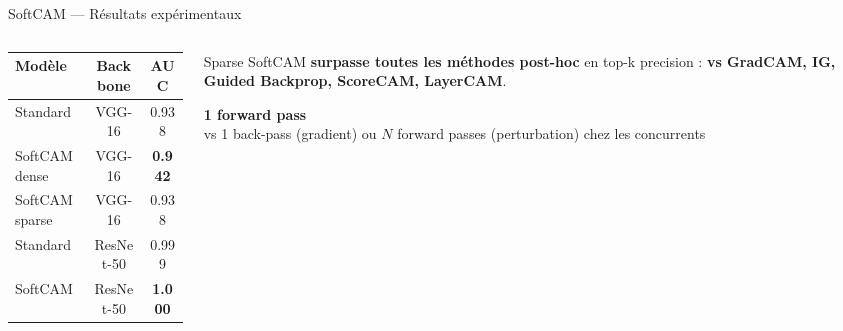 \documentclass[10pt]{beamer}
\begin{document}
\begin{frame}{SoftCAM — Résultats expérimentaux}
  \begin{columns}
    \begin{column}{0.50\textwidth}
      \begin{tcolorbox}[colback=blue!3, colframe=blue!50!black, arc=2mm,
                        fonttitle=\bfseries, title=Performance préservée (Table 1)]
        \begin{tabular}{lcc}
          \toprule
          \textbf{Modèle} & \textbf{Backbone} & \textbf{AUC} \\
          \midrule
          Standard         & VGG-16    & 0.938 \\
          SoftCAM dense    & VGG-16    & \textbf{0.942} \\
          SoftCAM sparse   & VGG-16    & 0.938 \\
          Standard         & ResNet-50 & 0.999 \\
          SoftCAM          & ResNet-50 & \textbf{1.000} \\
          \bottomrule
        \end{tabular}
      \end{tcolorbox}
    \end{column}
    \begin{column}{0.46\textwidth}
      \begin{tcolorbox}[colback=green!3, colframe=green!50!black, arc=2mm,
                        fonttitle=\bfseries, title=Explicabilité (Fig. 3)]
        Sparse SoftCAM \textbf{surpasse toutes les méthodes post-hoc} en
        top-k precision : \textbf{vs GradCAM, IG, Guided Backprop, ScoreCAM, LayerCAM}.
      \end{tcolorbox}
      \begin{tcolorbox}[colback=orange!3, colframe=orange!60!black, arc=2mm,
                        fonttitle=\bfseries, title=Coût computationnel]
        \textbf{1 forward pass}\\[1pt]
        vs 1 back-pass (gradient) ou $N$ forward passes (perturbation) chez les concurrents
      \end{tcolorbox}
    \end{column}
  \end{columns}
\end{frame}
\end{document}

